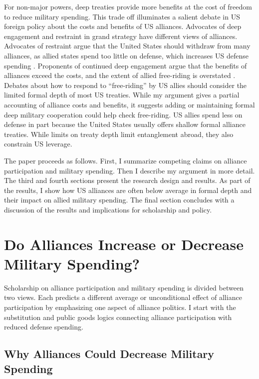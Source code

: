 \documentclass[12pt]{article}
\begin{document}
For non-major powers, deep treaties provide more benefits at the cost of freedom to reduce military spending. 
This trade off illuminates a salient debate in US foreign policy about the costs and benefits of US alliances. 
Advocates of deep engagement \citep{Brooksetal2013} and restraint \citep{Posen2014} in grand strategy have different views of alliances. 
Advocates of restraint argue that the United States should withdraw from many alliances, as allied states spend too little on defense, which increases US defense spending \citep{Preble2009}.
Proponents of continued deep engagement argue that the benefits of alliances exceed the costs, and the extent of allied free-riding is overstated \citep{BrandsFeaver2017}. 
Debates about how to respond to ``free-riding'' by US allies should consider the limited formal depth of most US treaties.
While my argument gives a partial accounting of alliance costs and benefits, it suggests adding or maintaining formal deep military cooperation could help check free-riding.   
US allies spend less on defense in part because the United States usually offers shallow formal alliance treaties. 
While limits on treaty depth limit entanglement abroad, they also constrain US leverage. 


The paper proceeds as follows. 
First, I summarize competing claims on alliance participation and military spending. 
Then I describe my argument in more detail. 
The third and fourth sections present the research design and results. 
As part of the results, I show how US alliances are often below average in formal depth and their impact on allied military spending. 
The final section concludes with a discussion of the results and implications for scholarship and policy.  



\section{Do Alliances Increase or Decrease Military Spending?}


Scholarship on alliance participation and military spending is divided between two views.
Each predicts a different average or unconditional effect of alliance participation by emphasizing one aspect of alliance politics.  
I start with the substitution and public goods logics connecting alliance participation with reduced defense spending. 


\subsection{Why Alliances Could Decrease Military Spending} 
\end{document}
